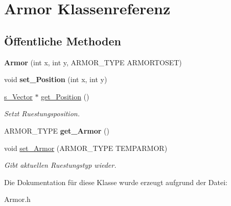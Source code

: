 \hypertarget{class_armor}{\section{Armor Klassenreferenz}
\label{class_armor}
}
\subsection*{Öffentliche Methoden}
\begin{DoxyCompactItemize}
\item 
\hypertarget{class_armor_ab9f3edb9b0fe736b82056fbfd6abe467}{{\bfseries Armor} (int x, int y, A\-R\-M\-O\-R\-\_\-\-T\-Y\-P\-E A\-R\-M\-O\-R\-T\-O\-S\-E\-T)}\label{class_armor_ab9f3edb9b0fe736b82056fbfd6abe467}

\item 
\hypertarget{class_armor_a007fd5929f7cd4c3ab062094c2465371}{void {\bfseries set\-\_\-\-Position} (int x, int y)}\label{class_armor_a007fd5929f7cd4c3ab062094c2465371}

\item 
\hypertarget{class_armor_aafd49a78e1d9de2ec03bdef3c5b7f454}{\hyperlink{structs___vector}{s\-\_\-\-Vector} $\ast$ \hyperlink{class_armor_aafd49a78e1d9de2ec03bdef3c5b7f454}{get\-\_\-\-Position} ()}\label{class_armor_aafd49a78e1d9de2ec03bdef3c5b7f454}

\begin{DoxyCompactList}\small\item\em Setzt Ruestungsposition. \end{DoxyCompactList}\item 
\hypertarget{class_armor_a77760241405973937918be3377b2a02d}{A\-R\-M\-O\-R\-\_\-\-T\-Y\-P\-E {\bfseries get\-\_\-\-Armor} ()}\label{class_armor_a77760241405973937918be3377b2a02d}

\item 
\hypertarget{class_armor_a8c1238b98e8bc91fb39e0e7ef8a331bf}{void \hyperlink{class_armor_a8c1238b98e8bc91fb39e0e7ef8a331bf}{set\-\_\-\-Armor} (A\-R\-M\-O\-R\-\_\-\-T\-Y\-P\-E T\-E\-M\-P\-A\-R\-M\-O\-R)}\label{class_armor_a8c1238b98e8bc91fb39e0e7ef8a331bf}

\begin{DoxyCompactList}\small\item\em Gibt aktuellen Ruestungstyp wieder. \end{DoxyCompactList}\end{DoxyCompactItemize}


Die Dokumentation für diese Klasse wurde erzeugt aufgrund der Datei\-:\begin{DoxyCompactItemize}
\item 
Armor.\-h\end{DoxyCompactItemize}
